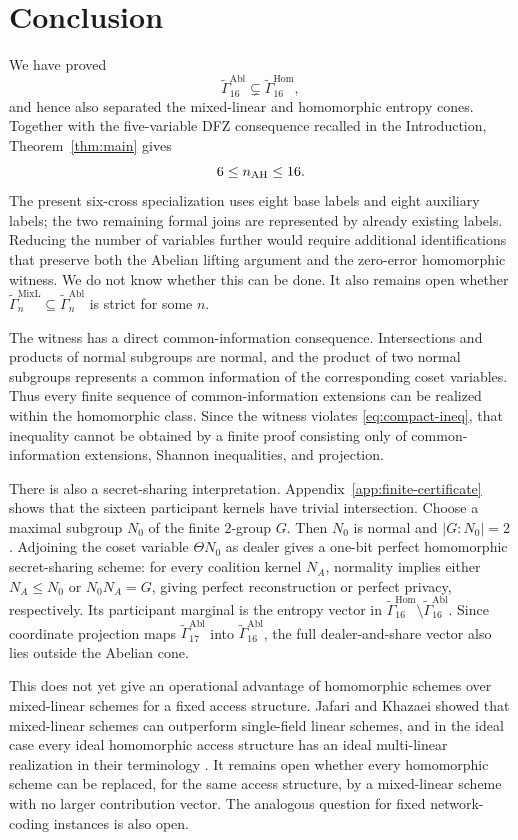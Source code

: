 \documentclass[journal]{IEEEtran}
\newcommand{\MixL}{\widetilde\Gamma^{\mathrm{MixL}}}
\newcommand{\Abl}{\widetilde\Gamma^{\mathrm{Abl}}}
\newcommand{\Hom}{\widetilde\Gamma^{\mathrm{Hom}}}
\begin{document}
\section{Conclusion}\label{sec:discussion}
We have proved
\[
   \Abl_{16}\subsetneq\Hom_{16},
\]
and hence also separated the mixed-linear and homomorphic entropy cones.
Together with the five-variable DFZ consequence recalled in the Introduction,
Theorem~\ref{thm:main} gives
\[
   6\le n_{\rm AH}\le16.
\]
The present six-cross specialization uses eight base labels and eight auxiliary
labels; the two remaining formal joins are represented by already existing
labels.  Reducing the number of variables further would require additional
identifications that preserve both the Abelian lifting argument and the
zero-error homomorphic witness.  We do not know whether this can be done.  It
also remains open whether $\MixL_n\subseteq\Abl_n$ is strict for some $n$.

The witness has a direct common-information consequence.  Intersections and
products of normal subgroups are normal, and the product of two normal
subgroups represents a common information of the corresponding coset
variables.  Thus every finite sequence of common-information extensions can be
realized within the homomorphic class.  Since the witness violates
\eqref{eq:compact-ineq}, that inequality cannot be obtained by a finite proof
consisting only of common-information extensions, Shannon inequalities, and
projection.

There is also a secret-sharing interpretation.  Appendix~\ref{app:finite-certificate}
shows that the sixteen participant kernels have trivial intersection.  Choose
a maximal subgroup $N_0$ of the finite $2$-group $G$.  Then $N_0$ is normal
and $|G:N_0|=2$.  Adjoining the coset variable $\Theta N_0$ as dealer gives a
one-bit perfect homomorphic secret-sharing scheme: for every coalition kernel
$N_A$, normality implies either $N_A\le N_0$ or $N_0N_A=G$, giving perfect
reconstruction or perfect privacy, respectively.  Its participant marginal is
the entropy vector in $\Hom_{16}\setminus\Abl_{16}$.  Since coordinate
projection maps $\Abl_{17}$ into $\Abl_{16}$, the full dealer-and-share vector
also lies outside the Abelian cone.

This does not yet give an operational advantage of homomorphic schemes over
mixed-linear schemes for a fixed access structure.  Jafari and Khazaei showed
that mixed-linear schemes can outperform single-field linear schemes, and in
the ideal case every ideal homomorphic access structure has an ideal
multi-linear realization in their terminology \cite{JafariKhazaei2021}.  It
remains open whether every homomorphic scheme can be replaced, for the same
access structure, by a mixed-linear scheme with no larger contribution vector.
The analogous question for fixed network-coding instances is also open.
\end{document}
